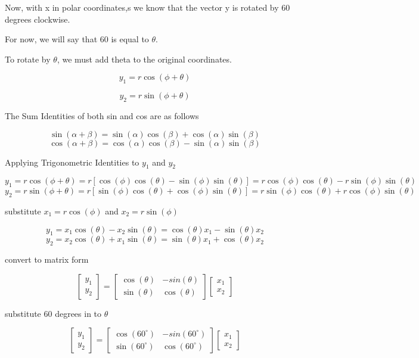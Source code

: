 \documentclass{ximera}
\begin{document}
\begin{enumerate}
\noindent Now, with x in polar coordinates,s we know that the vector y is rotated by 60 degrees clockwise. 

\noindent For now, we will say that 60 is equal to $\theta$. 

\noindent To rotate by $\theta$, we must add theta to the original coordinates.

\[y_1 = r \cos(\phi + \theta)\]

\[y_2 = r \sin(\phi + \theta)\]

\noindent The Sum Identities of both sin and cos are as follows

\[\sin(\alpha + \beta) = \sin(\alpha)\cos(\beta) + \cos(\alpha)\sin(\beta)\]
\[\cos(\alpha + \beta) = \cos(\alpha)\cos(\beta) - \sin(\alpha)\sin(\beta)\]

\noindent Applying Trigonometric Identities to $y_1$ and $y_2$

\[y_1 = r \cos(\phi + \theta) = r[\cos(\phi)\cos(\theta) - \sin(\phi)\sin(\theta)] = r\cos(\phi)\cos(\theta) - r\sin(\phi)\sin(\theta)
\]
\[
y_2 = r \sin(\phi + \theta) = r[\sin(\phi)\cos(\theta) + \cos(\phi)\sin(\theta)] = r\sin(\phi)\cos(\theta) + r\cos(\phi)\sin(\theta)
\]


\noindent substitute $x_1 = r \cos(\phi)$ and $x_2 = r \sin(\phi)$

\[
y_1 = x_1 \cos(\theta) - x_2 \sin(\theta)  = \cos(\theta) x_1 - \sin(\theta)x_2 \]
\[y_2 = x_2 \cos(\theta) + x_1 \sin(\theta) = \sin(\theta) x_1 + \cos(\theta) x_2\]

\noindent convert to matrix form

\[
\begin{bmatrix}
    y_1 \\
    y_2
\end{bmatrix} = 
\begin{bmatrix}
    \cos(\theta) & -sin(\theta) \\
    \sin(\theta) & \cos(\theta)
\end{bmatrix}
\begin{bmatrix}
    x_1 \\
    x_2
\end{bmatrix}
\]

\noindent substitute 60 degrees in to $\theta$

\[
\begin{bmatrix}
    y_1 \\
    y_2
\end{bmatrix} = 
\begin{bmatrix}
    \cos(60^{\circ}) & -sin(60^{\circ}) \\
    \sin(60^{\circ}) & \cos(60^{\circ})
\end{bmatrix}
\begin{bmatrix}
    x_1 \\
    x_2
\end{bmatrix}
\]


\end{enumerate}
\end{document}
